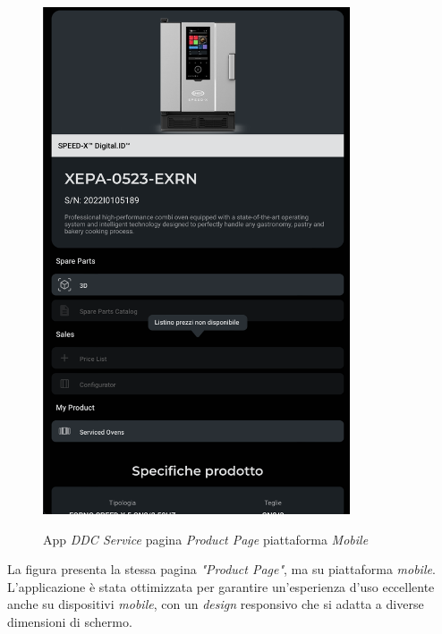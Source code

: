 \begin{figure}[H]
    \centering
    \includegraphics[alt={Screenshot della pagina \textit{"Product Page"} su piattaforma \textit{mobile}}, height=15cm]{img/ProductPageMobile}
    \caption{App \textit{DDC Service} pagina \textit{Product Page} piattaforma \textit{Mobile}}
    \label{fig:productpagemobile}
\end{figure}

La figura presenta la stessa pagina \textit{"Product Page"}, ma su piattaforma \textit{mobile}.
L'applicazione è stata ottimizzata per garantire un'esperienza d'uso eccellente anche su dispositivi \textit{mobile}, con un \textit{design} responsivo che si adatta a diverse dimensioni di schermo.

